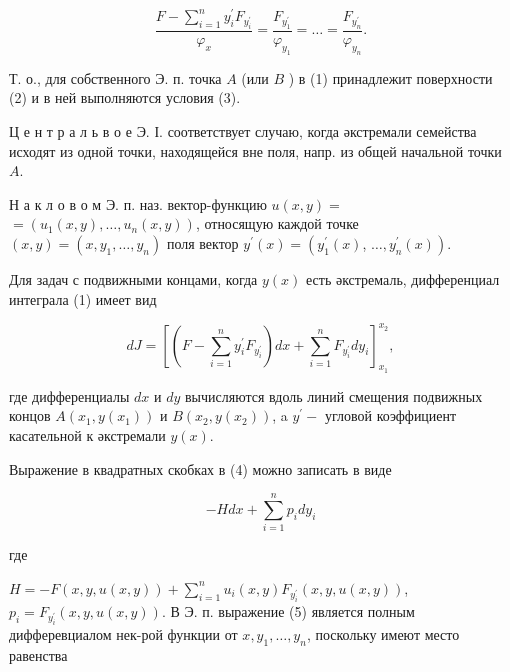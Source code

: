 \documentclass[10pt]{article}
\begin{document}
\[

\frac{F-\sum_{i=1}^{n} y_{i}^{\prime} F_{y_{i}^{\prime}}}{\varphi_{x}}=\frac{F_{y_{1}^{\prime}}}{\varphi_{y_{1}}}=\ldots=\frac{F_{y_{n}^{\prime}}}{\varphi_{y_{n}}} .

\]



Т. о., для собственного Э. п. точка $A$ (или $B$ ) в (1) принадлежит поверхности (2) и в ней выполняются условия (3).



Ц е н т р а л ь в о е Э. І. соответствует случаю, когда әкстремали семейства исходят из одной точки, находящейся вне поля, напр. из общей начальной точки $A$.



Н а к л о в о м Э. п. наз. вектор-функцию $u(x, y)=$ $=\left(u_{1}(x, y), \ldots, u_{n}(x, y)\right)$, относящую каждой точке $(x, y)=\left(x, y_{1}, \ldots, y_{n}\right)$ поля вектор $y^{\prime}(x)=\left(y_{1}^{\prime}(x)\right.$, $\left.\ldots, y_{n}^{\prime}(x)\right)$.



Для задач с подвижными концами, когда $y(x)$ есть әкстремаль, дифференциал интеграла (1) имеет вид



\[

d J=\left[\left(F-\sum_{i=1}^{n} y_{i}^{\prime} F_{y_{i}^{\prime}}\right) d x+\sum_{i=1}^{n} F_{y_{i}^{\prime}} d y_{i}\right]_{x_{1}}^{x_{2}},

\]



где дифференциалы $d x$ и $d y$ вычисляются вдоль линий смещения подвижных концов $A\left(x_{1}, y\left(x_{1}\right)\right)$ и $B\left(x_{2}, y\left(x_{2}\right)\right)$, a $y^{\prime}-$ угловой коэффициент касательной к әкстремали $y(x)$.



Выражение в квадратных скобках в (4) можно записать в виде



\[

-H d x+\sum_{i=1}^{n} p_{i} d y_{i}

\]



где



$H=-F(x, y, u(x, y))+\sum_{i=1}^{n} u_{i}(x, y) F_{y_{i}^{\prime}}(x, y, u(x, y))$, $p_{i}=F_{y_{i}^{\prime}}(x, y, u(x, y))$. В Э. п. выражение (5) является полным дифферевциалом нек-рой функции от $x, y_{1}, \ldots, y_{n}$, поскольку имеют место равенства
\end{document}

